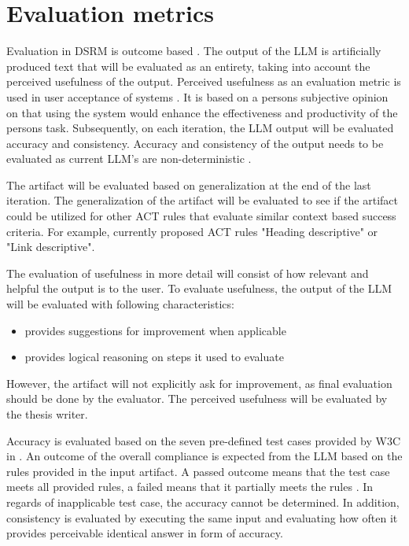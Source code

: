 \section{Evaluation metrics}

Evaluation in DSRM is outcome based \citep{design_science_eval}. The output of the LLM is artificially produced text that will be evaluated as an entirety, taking into account the perceived usefulness of the output. Perceived usefulness as an evaluation metric is used in user acceptance of systems \citep{perceived_usefulness}. It is based on a persons subjective opinion on that using the system would enhance the effectiveness and productivity of the persons task. Subsequently, on each iteration, the LLM output will be evaluated accuracy and consistency. Accuracy and consistency of the output needs to be evaluated as current LLM's are non-deterministic \citep{ouyang2023llm, power_determinism}.

The artifact will be evaluated based on generalization at the end of the last iteration. The generalization of the artifact will be evaluated to see if the artifact could be utilized for other ACT rules that evaluate similar context based success criteria. For example, currently proposed ACT rules "Heading descriptive" or "Link descriptive".

The evaluation of usefulness in more detail will consist of how relevant and helpful the output is to the user. To evaluate usefulness, the output of the LLM will be evaluated with following characteristics: 

\begin{itemize}
    \item provides suggestions for improvement when applicable
    \item provides logical reasoning on steps it used to evaluate
\end{itemize}

However, the artifact will not explicitly ask for improvement, as final evaluation should be done by the evaluator. The perceived usefulness will be evaluated by the thesis writer.

Accuracy is evaluated based on the seven pre-defined test cases provided by W3C in \textcite{act_rule_g88}. An outcome of the overall compliance is expected from the LLM based on the rules provided in the input artifact. A passed outcome means that the test case meets all provided rules, a failed means that it partially meets the rules \citep{act_rule_g88}. In regards of inapplicable test case, the accuracy cannot be determined. In addition, consistency is evaluated by executing the same input and evaluating how often it provides perceivable identical answer in form of accuracy. 

